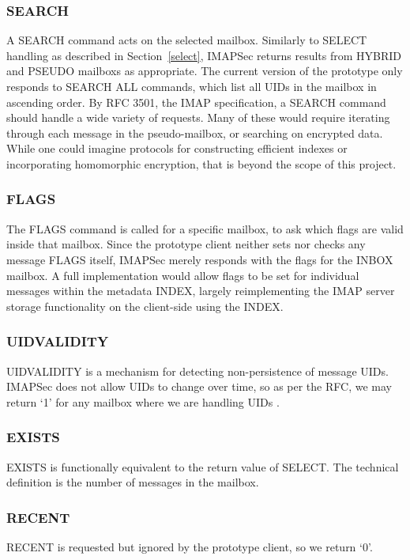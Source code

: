 \documentclass[pageno]{jpaper}
\newcommand{\project}{IMAPSec }
\begin{document}
\subsubsection{SEARCH} A SEARCH command acts on the selected mailbox. Similarly to SELECT handling as described in Section~\ref{select}, \project returns results from HYBRID and PSEUDO mailboxs as appropriate. The current version of the prototype only responds to SEARCH ALL commands, which list all UIDs in the mailbox in ascending order. By RFC 3501, the IMAP specification, a SEARCH command should handle a wide variety of requests. Many of these would require iterating through each message in the pseudo-mailbox, or searching on encrypted data. While one could imagine protocols for constructing efficient indexes or incorporating homomorphic encryption, that is beyond the scope of this project.

\subsubsection{FLAGS} The FLAGS command is called for a specific mailbox, to ask which flags are valid inside that mailbox. Since the prototype client neither sets nor checks any message FLAGS itself, \project merely responds with the flags for the INBOX mailbox. A full implementation would allow flags to be set for individual messages within the metadata INDEX, largely reimplementing the IMAP server storage functionality on the client-side using the INDEX.

\subsubsection{UIDVALIDITY} UIDVALIDITY is a mechanism for detecting non-persistence of message UIDs. \project does not allow UIDs to change over time, so as per the RFC, we may return `1' for any mailbox where we are handling UIDs \cite{rfc3501}.

\label{exists}
\subsubsection{EXISTS} EXISTS is functionally equivalent to the return value of SELECT. The technical definition is the number of messages in the mailbox.

\subsubsection{RECENT} RECENT is requested but ignored by the prototype client, so we return `0'.
\end{document}
